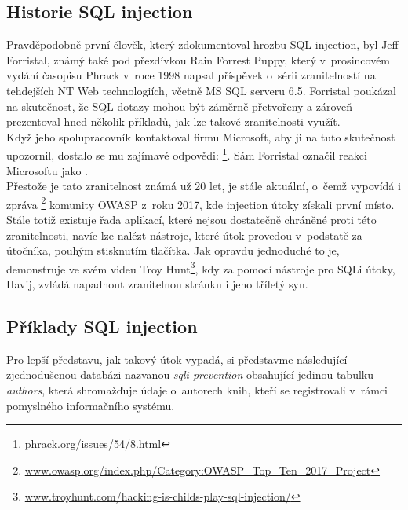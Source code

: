 \subsection{Historie SQL injection} \label{subsec:3:sqlihistorie}
Pravděpodobně první člověk, který zdokumentoval hrozbu SQL injection, byl Jeff Forristal, známý také pod přezdívkou Rain Forrest Puppy, 
který v~prosincovém vydání časopisu Phrack v~roce 1998 napsal příspěvek o~sérii zranitelností na tehdejších NT Web technologiích, včetně 
MS SQL serveru 6.5. Forristal poukázal na skutečnost, že SQL dotazy mohou být záměrně přetvořeny a zároveň prezentoval hned několik příkladů, 
jak lze takové zranitelnosti využít. \\

Když jeho spolupracovník kontaktoval firmu Microsoft, aby ji na tuto skutečnost upozornil,
dostalo se mu zajímavé odpovědi: \textit{}\footnote{\url{phrack.org/issues/54/8.html}}. Sám Forristal označil reakci Microsoftu jako \textit{}.\\

Přestože je tato zranitelnost známá už 20 let, je stále aktuální, o~čemž vypovídá i zpráva 
\textit{}\footnote{\url{www.owasp.org/index.php/Category:OWASP_Top_Ten_2017_Project}} 
komunity OWASP z~roku 2017, kde injection útoky získali první místo. \\

Stále totiž existuje řada aplikací, které nejsou dostatečně chráněné proti této zranitelnosti, navíc lze nalézt nástroje, které
útok provedou v~podstatě za útočníka, pouhým stisknutím tlačítka. Jak opravdu jednoduché to je, demonstruje ve svém videu Troy 
Hunt\footnote{\url{www.troyhunt.com/hacking-is-childs-play-sql-injection/}}, kdy za pomocí nástroje pro SQLi útoky, Havij, 
zvládá napadnout zranitelnou stránku i jeho tříletý syn.

\subsection{Příklady SQL injection} \label{subsec:3:sqlipriklady}
Pro lepší představu, jak takový útok vypadá, si představme následující zjednodušenou databázi nazvanou \textit{sqli-prevention} obsahující jedinou
tabulku \textit{authors}, která shromažďuje údaje o~autorech knih, kteří se registrovali v~rámci pomyslného informačního systému. \\

